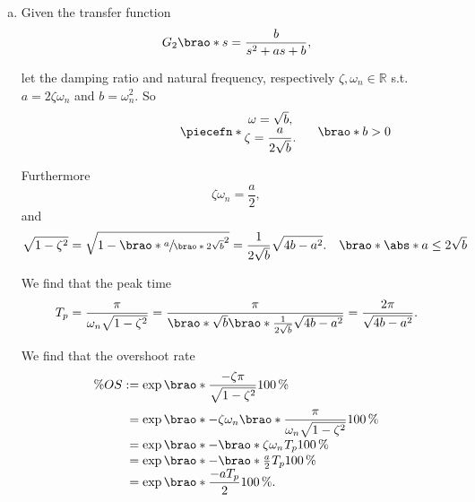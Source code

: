 \documentclass[12pt]{article}
\DeclarePairedDelimiter\brao()%
\DeclarePairedDelimiter\abs||
\DeclarePairedDelimiter\piecefn\{.
\begin{document}
\begin{enumerate}[(a)]
    \item
        Given the transfer function
        \begin{equation}
            G_2\brao*s = \frac{b}{s^2 + as + b},
        \end{equation}
        
        let the damping ratio and natural frequency, respectively $\zeta, \omega_n \in \mathbb{R}$ s.t. $a = 2\zeta\omega_n$ and $b = \omega_n^2$. So
        \begin{equation}
            \piecefn*{
                \begin{matrix}
                    \omega = \sqrt{b}\rlap, \\*
                    \zeta = \dfrac{a}{2\sqrt{b}}\rlap. \\*
                \end{matrix}
            }\rlap{$\qquad\brao*{b > 0}$}
        \end{equation}

        Furthermore
        \begin{equation}
            \zeta\omega_n = \frac{a}2,
        \end{equation}
        and
        \begin{equation}
            \sqrt{1 - \zeta^2} = \sqrt{1 - \brao*{\sfrac{a}{\brao*{2\sqrt{b}}}}^2} = \frac{1}{2\sqrt{b}} \sqrt{4b - a^2}.%
            \hskip1em\brao*{\abs*{a} \leq 2\sqrt{b}}
        \end{equation}
        
        We find that the peak time
        \begin{equation}
            T_p = \frac\pi{\omega_n \sqrt{1 - \zeta^2}} = \frac\pi{\brao*{\sqrt{b}}\brao*{ \frac{1}{2\sqrt{b}}\sqrt{4b - a^2}}} = \frac{2\pi}{\sqrt{4b - a^2}}.
        \end{equation}

        We find that the overshoot rate
        \begin{equation}
            \begin{array}{*2{@{}r}@{}l@{}}
                \% OS
                &{}:={}& \exp\brao*{\dfrac{-\zeta\pi}{\sqrt{1 - \zeta^2}}} \SI{100}\percent
            \\*[1.3em]
                &{}={}& \exp\brao*{-\zeta\omega_n\brao*{\dfrac{\pi}{\omega_n\sqrt{1 - \zeta^2}}}} \SI{100}\percent
            \\*
                &{}={}& \exp\brao*{-\brao*{\zeta\omega_n}^{\vphantom{1}}T_p} \SI{100}\percent
            \\*
                &{}={}& \exp\brao*{-\brao*{\tfrac{a}2}^{\vphantom{1}}T_p} \SI{100}\percent
            \\*
                & {}={} & \exp\brao*{\dfrac{-aT_p}{2}} \SI{100}\percent\rlap.
            \\*
            \end{array}
        \end{equation}


\end{enumerate}
\end{document}
